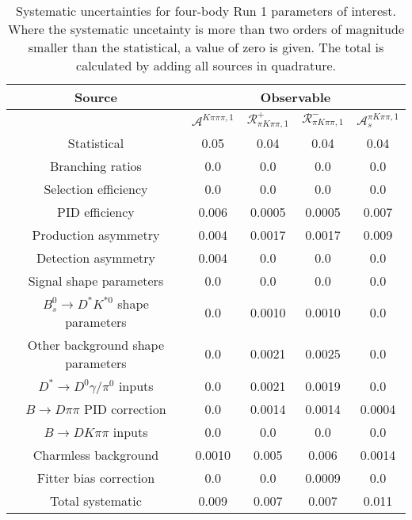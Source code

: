 \begin{sidewaystable}
  \centering
  \begin{tabular}{ccccc}
      \toprule
      Source & \multicolumn{4}{c}{Observable} \\
      \midrule
       & $\mathcal{A}^{K\pi\pi\pi,1}$ & $\mathcal{R}_{\pi K\pi\pi,1}^+$ & $\mathcal{R}_{\pi K\pi\pi,1}^-$ & $\mathcal{A}_s^{\pi K\pi\pi,1}$ \\
      \midrule
      Statistical & 0.05 & 0.04 & 0.04 & 0.04 \\
      \midrule
      Branching ratios & 0.0  & 0.0  & 0.0  & 0.0  \\
      Selection efficiency & 0.0  & 0.0  & 0.0  & 0.0  \\
      PID efficiency & 0.006 & 0.0005 & 0.0005 & 0.007 \\
      Production asymmetry & 0.004 & 0.0017 & 0.0017 & 0.009 \\
      Detection asymmetry & 0.004 & 0.0  & 0.0  & 0.0  \\
      Signal shape parameters & 0.0  & 0.0  & 0.0  & 0.0  \\
      $B^0_s \to D^* K^{*0}$ shape parameters & 0.0  & 0.0010 & 0.0010 & 0.0  \\
      Other background shape parameters & 0.0  & 0.0021 & 0.0025 & 0.0  \\
      $D^* \to D^0 \gamma/\pi^0$ inputs & 0.0  & 0.0021 & 0.0019 & 0.0  \\
      $B\to D\pi\pi$ PID correction & 0.0  & 0.0014 & 0.0014 & 0.0004 \\
      $B\to DK\pi\pi$ inputs & 0.0  & 0.0  & 0.0  & 0.0  \\
      Charmless background & 0.0010 & 0.005 & 0.006 & 0.0014 \\
      Fitter bias correction & 0.0  & 0.0  & 0.0009 & 0.0  \\
      \midrule
      Total systematic & 0.009 & 0.007 & 0.007 & 0.011 \\
      \bottomrule
  \end{tabular}
  \caption{Systematic uncertainties for four-body Run 1 parameters of interest. Where the systematic uncetainty is more than two orders of magnitude smaller than the statistical, a value of zero is given. The total is calculated by adding all sources in quadrature.}
\label{tab:fourBody_run1_systematics}
\end{sidewaystable}
